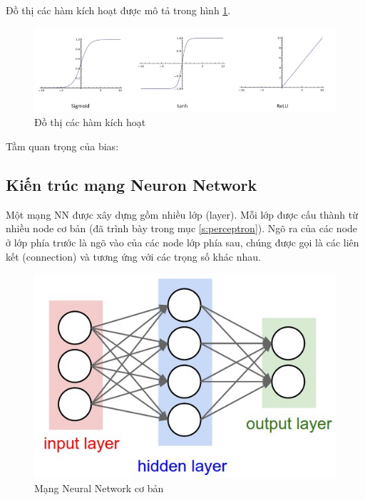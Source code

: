 \noindent Đồ thị các hàm kích hoạt được mô tả trong hình \ref{fig:activation_function}.

\FloatBarrier
\begin{figure}[htp]
\begin{center}
\includegraphics[scale=0.8]{chap2/c2_figs/activation_function.PNG}
\end{center}
\caption{Đồ thị các hàm kích hoạt}
\label{fig:activation_function}
\end{figure}
\FloatBarrier

Tầm quan trọng của bias: 

\subsection{Kiến trúc mạng Neuron Network}

Một mạng NN được xây dựng gồm nhiều lớp (layer). Mỗi lớp được cấu thành từ nhiều node cơ bản (đã trình bày trong mục \ref{s:perceptron}). Ngõ ra của các node ở lớp phía trước là ngõ vào của các node lớp phía sau, chúng được gọi là các liên kết (connection) và tương ứng với các trọng số khác nhau.

\FloatBarrier
\begin{figure}[htp]
\begin{center}
\includegraphics[scale=0.8]{chap2/c2_figs/structure_NN.PNG}
\end{center}
\caption{Mạng Neural Network cơ bản}
\label{fig:structure_NN}
\end{figure}
\FloatBarrier

